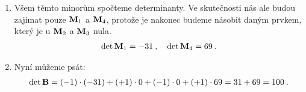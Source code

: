 \begin{itemize}
\begin{example}
\begin{enumerate}
            \item Všem těmto minorům spočteme determinanty. Ve skutečnosti nás ale budou zajímat pouze $\mathbf{M}_1$ a $\mathbf{M}_4$, protože je nakonec budeme násobit daným prvkem, který je u $\mathbf{M}_2$ a $\mathbf{M}_3$ nula.
            \begin{align}
                \det \mathbf{M}_1 = -31 \:, \quad \det \mathbf{M}_4 = 69 \:.
            \end{align}

            \item Nyní můžeme psát:
            \begin{align}
                \det \mathbf{B} = (-1) \cdot (-31) + (+1) \cdot 0 + (-1) \cdot 0 + (+1) \cdot 69 = 31 + 69 = 100 \:.
            \end{align}
        \end{enumerate}

    \end{example}


\end{itemize}
